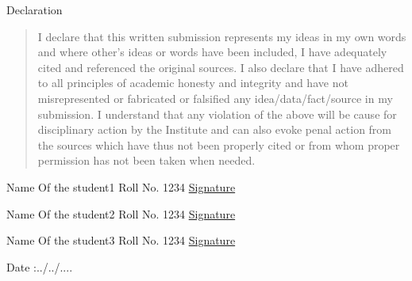 
\newpage
\begin{center}
\huge Declaration
\end{center}

\vspace{0.5in}
\begin{quote}
I declare that this written submission represents my ideas in my own words and where other’s ideas or words have been included, I have adequately cited and referenced the original sources. I also declare that I have adhered to all principles of academic honesty and integrity and have not misrepresented or fabricated or falsified any idea/data/fact/source in my submission. I understand that any violation of the above will be cause for disciplinary action by the Institute and can also evoke penal action from the sources which have thus not been properly cited or from whom proper permission has not been taken when needed.
\end{quote}
\vspace{1.5in}

\hspace{6.5cm}Name Of the student1 \hspace{0.2cm} Roll No. 1234 \hspace{0.2cm} \underline{Signature}
\vspace{0.1in}

\hspace{6.5cm}Name Of the student2 \hspace{0.2cm} Roll No. 1234 \hspace{0.2cm} \underline{Signature}
\vspace{0.1in}

\hspace{6.5cm}Name Of the student3 \hspace{0.2cm} Roll No. 1234 \hspace{0.2cm} \underline{Signature}

\vspace{0.2in}
\begin{flushleft}
  Date :../../....
\end{flushleft}
